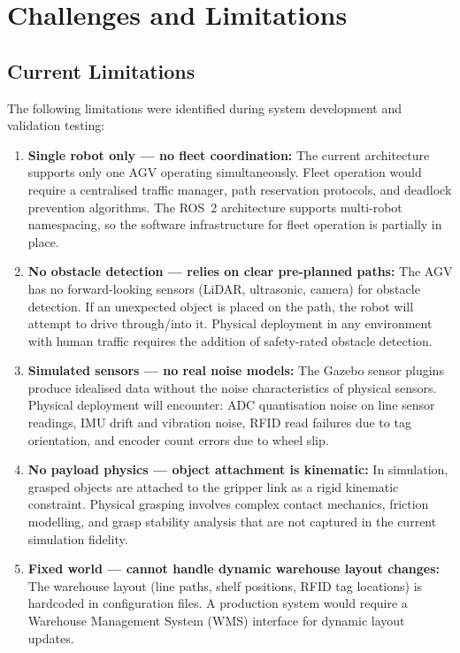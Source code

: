 \documentclass[12pt,a4paper,oneside]{report}
\begin{document}
\section{Challenges and Limitations}

\subsection{Current Limitations}

The following limitations were identified during system development and validation testing:

\begin{enumerate}
\item \textbf{Single robot only --- no fleet coordination:} The current architecture supports only one AGV operating simultaneously. Fleet operation would require a centralised traffic manager, path reservation protocols, and deadlock prevention algorithms. The ROS~2 architecture supports multi-robot namespacing, so the software infrastructure for fleet operation is partially in place.

\item \textbf{No obstacle detection --- relies on clear pre-planned paths:} The AGV has no forward-looking sensors (LiDAR, ultrasonic, camera) for obstacle detection. If an unexpected object is placed on the path, the robot will attempt to drive through/into it. Physical deployment in any environment with human traffic requires the addition of safety-rated obstacle detection.

\item \textbf{Simulated sensors --- no real noise models:} The Gazebo sensor plugins produce idealised data without the noise characteristics of physical sensors. Physical deployment will encounter: ADC quantisation noise on line sensor readings, IMU drift and vibration noise, RFID read failures due to tag orientation, and encoder count errors due to wheel slip.

\item \textbf{No payload physics --- object attachment is kinematic:} In simulation, grasped objects are attached to the gripper link as a rigid kinematic constraint. Physical grasping involves complex contact mechanics, friction modelling, and grasp stability analysis that are not captured in the current simulation fidelity.

\item \textbf{Fixed world --- cannot handle dynamic warehouse layout changes:} The warehouse layout (line paths, shelf positions, RFID tag locations) is hardcoded in configuration files. A production system would require a Warehouse Management System (WMS) interface for dynamic layout updates.


\end{enumerate}
\end{document}
